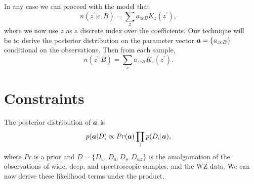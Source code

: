 \documentclass[11pt,preprint,flushrt]{aastex631}
\newcommand{\veca}{\mbox{\boldmath $a$}}
\begin{document}
In any case we can proceed with the model that
\begin{equation}
  n(z^\prime | c, B) = \sum_z a_{zcB} K_z(z^\prime),
  \label{azcB}
\end{equation}
where we now use $z$ as a discrete index over the coefficients.  Our
technique will be to derive the posterior distribution on the
parameter vector
$\veca=\{a_{zcB}\}$ conditional on the observations.  Then from each sample,
\begin{equation}
  n(z^\prime | B) = \sum_c a_{zcB}  K_z(z^\prime).
\end{equation}

\section{Constraints}
The posterior distribution of $\veca$ is
\begin{equation}
  p(\veca | D) \propto Pr(\veca) \prod_i p(D_i | \veca),
  \label{posterior}
\end{equation}
where $Pr$ is a prior and $D=\{D_w, D_d, D_s,D_{wz}\}$ is the
amalgamation of the observations of wide, deep, and spectroscopic
samples, and the WZ data.  We can now derive these likelihood terms
under the product.
\end{document}
